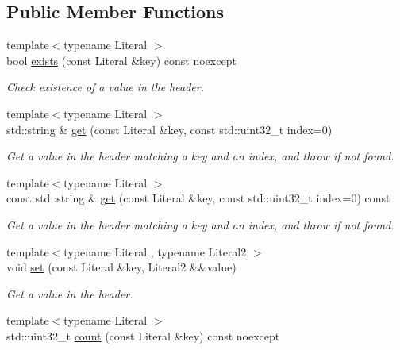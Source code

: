 \subsection*{Public Member Functions}
\begin{DoxyCompactItemize}
\item 
{\footnotesize template$<$typename Literal $>$ }\\bool \mbox{\hyperlink{classo_z_1_1_h_t_t_p_1_1_header_aac91315b9984871e672845f8a69cf1ef}{exists}} (const Literal \&key) const noexcept
\begin{DoxyCompactList}\small\item\em Check existence of a value in the header. \end{DoxyCompactList}\item 
{\footnotesize template$<$typename Literal $>$ }\\std\+::string \& \mbox{\hyperlink{classo_z_1_1_h_t_t_p_1_1_header_ad09c489218fdd63493dd5ce7b025265e}{get}} (const Literal \&key, const std\+::uint32\+\_\+t index=0)
\begin{DoxyCompactList}\small\item\em Get a value in the header matching a key and an index, and throw if not found. \end{DoxyCompactList}\item 
{\footnotesize template$<$typename Literal $>$ }\\const std\+::string \& \mbox{\hyperlink{classo_z_1_1_h_t_t_p_1_1_header_abad6705f4eff158eec13825b3419d265}{get}} (const Literal \&key, const std\+::uint32\+\_\+t index=0) const
\begin{DoxyCompactList}\small\item\em Get a value in the header matching a key and an index, and throw if not found. \end{DoxyCompactList}\item 
{\footnotesize template$<$typename Literal , typename Literal2 $>$ }\\void \mbox{\hyperlink{classo_z_1_1_h_t_t_p_1_1_header_a3063660c3eb22844296e83807b8a62e1}{set}} (const Literal \&key, Literal2 \&\&value)
\begin{DoxyCompactList}\small\item\em Get a value in the header. \end{DoxyCompactList}\item 
{\footnotesize template$<$typename Literal $>$ }\\std\+::uint32\+\_\+t \mbox{\hyperlink{classo_z_1_1_h_t_t_p_1_1_header_a59d2eb480ab72b94240e8eb87cf7aee2}{count}} (const Literal \&key) const noexcept

\end{DoxyCompactItemize}
